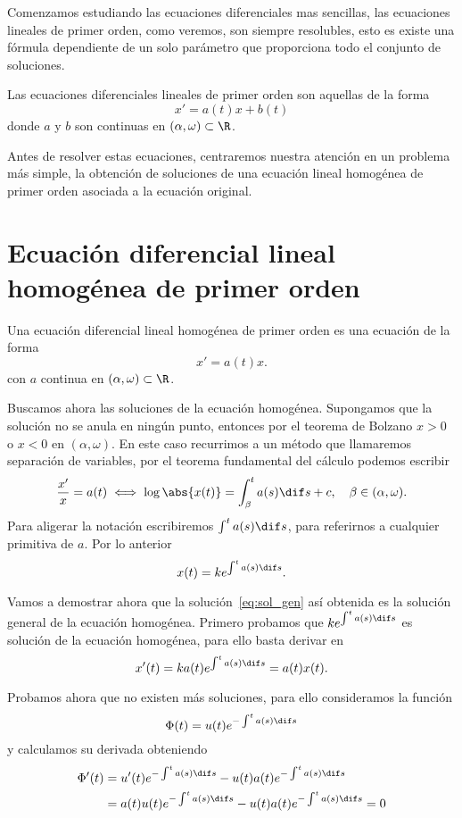 \documentclass[../main.tex]{subfiles}
\begin{document}
Comenzamos estudiando las ecuaciones diferenciales mas sencillas, las ecuaciones
lineales de primer orden, como veremos, son siempre resolubles, esto es existe
una fórmula dependiente de un solo parámetro que proporciona todo el conjunto de
soluciones.

\begin{definition}
Las ecuaciones diferenciales lineales de primer orden son aquellas de la forma
\[x' = a(t)x + b(t)\]
donde \(a\) y \(b\) son continuas en \((\alpha, \omega) \subset \R\).
\end{definition}

Antes de resolver estas ecuaciones, centraremos nuestra atención en un problema
más simple, la obtención de soluciones de una ecuación lineal homogénea de 
primer orden asociada a la ecuación original.

\section{Ecuación diferencial lineal homogénea de primer orden}

\begin{definition}
Una ecuación diferencial lineal homogénea de primer orden es una ecuación de la
forma
\[x' = a(t)x.\]
con \(a\) continua en \((\alpha, \omega) \subset \R\).
\end{definition}

Buscamos ahora las soluciones de la ecuación homogénea. Supongamos que la
solución no se anula en ningún punto, entonces por el teorema de Bolzano
\(x > 0\) o \(x < 0\) en \((\alpha, \omega)\). En este caso recurrimos a un
método que llamaremos separación de variables, por el teorema fundamental del
cálculo podemos escribir
\[\frac{x'}{x} = a(t) \iff \log\abs{x(t)} = \int_{\beta}^t a(s) \dif s + c,
	\quad \beta \in (\alpha, \omega).\]
Para aligerar la notación escribiremos \(\int^t a(s) \dif s\), para referirnos 
a cualquier primitiva de \(a\). Por lo anterior
\begin{equation}
	x(t) = k e^{\int^t a(s) \dif s}. \label{eq:sol_gen}
\end{equation}

Vamos a demostrar ahora que la solución~\eqref{eq:sol_gen}
así obtenida es la solución general de la ecuación homogénea.
Primero probamos que \(k e^{\int^t a(s) \dif s}\) es
solución de la ecuación homogénea, para ello basta derivar en
\[x'(t) = k a(t) e^{\int^t a(s) \dif s} = a(t) x(t).\]

Probamos ahora que no existen más soluciones, para ello consideramos la función
\[\Phi(t) = u(t) e^{-\int^t a(s) \dif s}\]
y calculamos su derivada obteniendo
\begin{align*}
	\Phi'(t) &= u'(t) e^{-\int^t a(s) \dif s}
		- u(t) a(t) e^{-\int^t a(s) \dif s} \\
		&= a(t) u(t) e^{-\int^t a(s) \dif s} - u(t) a(t) e^{-\int^t a(s) \dif s}
		= 0
\end{align*}
\end{document}
